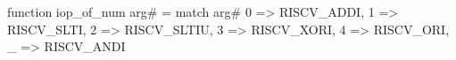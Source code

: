 function iop_of_num arg# = match arg# {
  0 => RISCV_ADDI,
  1 => RISCV_SLTI,
  2 => RISCV_SLTIU,
  3 => RISCV_XORI,
  4 => RISCV_ORI,
  _ => RISCV_ANDI
}
